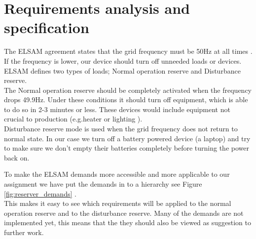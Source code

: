 \chapter[Requirements]{Requirements analysis and specification}
\label{chap:requirements}
The ELSAM agreement states that the grid frequency must be 50Hz at all times . If the frequency is lower, our device should turn off unneeded loads or devices. ELSAM defines two types of loads; Normal operation reserve and Disturbance reserve.\\
The Normal operation reserve should be completely activated when the frequency drops 49.9Hz. Under these conditions it should turn off equipment, which is able to do so in 2-3 minutes or less. These devices would include equipment not crucial to production (e.g.heater or lighting ).\\ 
Disturbance reserve mode is used when the grid frequency does not return to normal state. In our case we turn off a battery powered device (a laptop) and try to make sure we don't empty their batteries completely before turning the power back on.

To make the ELSAM demands more accessible and more applicable to our assignment we have put the demands in to a hierarchy see Figure \ref{fig:reserver_demands} .\\ This makes it easy to see which requirements will be applied to the normal operation reserve and to the disturbance reserve. Many of the demands are not implemented yet, this means that the they should also be viewed as suggestion to further work.

